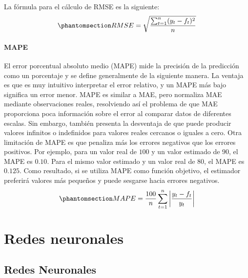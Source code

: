 \documentclass[
  us-letterpaper,
]{scrreprt}
\theoremstyle{plain}
\theoremstyle{definition}
\theoremstyle{plain}
\theoremstyle{definition}
\theoremstyle{remark}
\begin{document}
La fórmula para el cálculo de RMSE es la siguiente:
\begin{equation}\phantomsection\label{eq-RMSE}{RMSE= \sqrt{\frac{\sum_{t=1}^n (y_t-f_t)^2}{n}}}\end{equation}

\subsection{MAPE}\label{mape}

El error porcentual absoluto medio (MAPE) mide la precisión de la
predicción como un porcentaje y se define generalmente de la siguiente
manera. La ventaja es que es muy intuitivo interpretar el error
relativo, y un MAPE más bajo significa un error menor. MAPE es similar a
MAE, pero normaliza MAE mediante observaciones reales, resolviendo así
el problema de que MAE proporciona poca información sobre el error al
comparar datos de diferentes escalas. Sin embargo, también presenta la
desventaja de que puede producir valores infinitos o indefinidos para
valores reales cercanos o iguales a cero. Otra limitación de MAPE es que
penaliza más los errores negativos que los errores positivos. Por
ejemplo, para un valor real de \(100\) y un valor estimado de \(90\), el
MAPE es \(0.10\). Para el mismo valor estimado y un valor real de
\(80\), el MAPE es \(0.125\). Como resultado, si se utiliza MAPE como
función objetivo, el estimador preferirá valores más pequeños y puede
sesgarse hacia errores negativos.
\begin{equation}\phantomsection\label{eq-MAPE}{MAPE=\frac{100}{n}\sum_{t=1}^n \left| \frac{y_t-f_t}{y_t}\right|}\end{equation}

\part{Redes neuronales}

\chapter{Redes Neuronales}\label{redes-neuronales-1}
\end{document}
